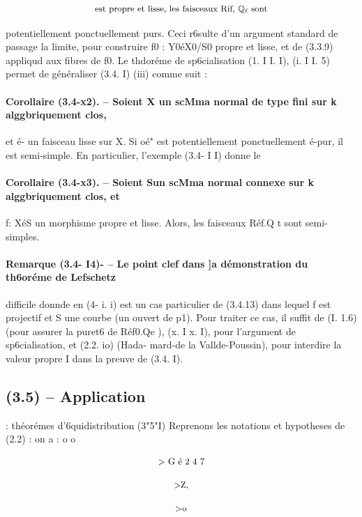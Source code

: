 \documentclass[11pt]{article}
\theoremstyle{remark}
\begin{document}
\[\text{\small est propre et lisse, les faisceaux Rif, \(\mathbb{Q}_{\ell}\) sont}\]

potentiellement ponctuellement purs. Ceci r6sulte d'un argument standard de passage la limite, pour construire f0 : Y0éX0/S0 propre et lisse, et de (3.3.9) appliqud aux fibres de f0. Le thdoréme de sp6cialisation (1. I I. I), (i. I I. 5) permet de généraliser (3.4. I) (iii) comme suit :

\paragraph{Corollaire (3.4-x2). -- Soient X un scMma normal de type fini sur k alggbriquement clos,}

et é- un faisceau lisse sur X. Si oé" est potentiellement ponctuellement é-pur, il est semi-simple. En particulier, l'exemple (3.4- I I) donne le

\paragraph{Corollaire (3.4-x3). -- Soient Sun scMma normal connexe sur k alggbriquement clos, et}

f: XéS un morphisme propre et lisse. Alors, les faisceaux Réf.Q t sont semi-simples.

\paragraph{Remarque (3.4- I4)- -- Le point clef dans ]a démonstration du th6oréme de Lefschetz}

difficile donnde en (4- i. i) est un cas particulier de (3.4.13) dans lequel f est projectif et S une courbe (un ouvert de p1). Pour traiter ce cas, il suffit de (I. 1.6) (pour assurer la puret6 de Réf0.Qe ), (x. I x. I), pour l'argument de sp6cialisation, et (2.2. io) (Hada- mard-de la Vallde-Poussin), pour interdire la valeur propre I dans la preuve de (3.4. I).

\subsection*{(3.5) -- Application}

: théorémes d'6quidistribution (3"5"I) Reprenons les notations et hypotheses de (2.2) : on a : o o

\[\text{\small > G é 2 4 7}\]

\[\text{\small >Z,}\]

\[\text{\small >o}\]
\end{document}
